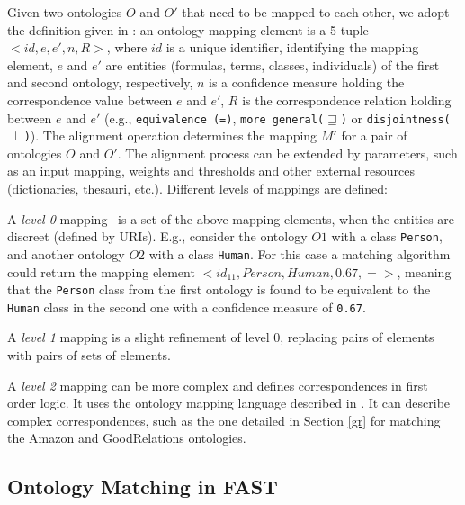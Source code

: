 Given two ontologies $O$ and $O'$ that need to be mapped to each other, we adopt the definition given in \cite{shvaiko2005schema_based}: an ontology mapping element is a 5-tuple $<id, e, e', n, R>$, where 
$id$ is a unique identifier, identifying the
mapping element, 
$e$ and $e'$ are entities (formulas, terms, classes, individuals) of the first and second ontology, respectively, 
$n$ is a confidence measure holding the correspondence value between $e$ and
$e'$, 
$R$ is the correspondence relation holding between $e$ and $e'$ (e.g., \texttt{equivalence (=)}, \texttt{more general($\sqsupseteq$)} or \texttt{disjointness($\perp$)}).
The alignment operation determines the mapping $M'$ for a pair of ontologies $O$ and $O'$. The alignment process can be extended by parameters, such as an input mapping, weights and thresholds and other external resources (dictionaries, thesauri, etc.). Different levels of mappings are defined:

A \textit{level 0} mapping~\cite{euzenat2004api} is a set of the above mapping elements, when the entities are discreet (defined by URIs). E.g., consider the ontology $O1$ with a class \texttt{Person}, and another ontology $O2$ with a class \texttt{Human}. For this case a matching algorithm  could return the mapping element $< id_{11}, Person, Human, 0.67, = >$, meaning that the \texttt{Person} class from the first ontology is found to be equivalent to the \texttt{Human} class in the second one with a confidence measure of \texttt{0.67}.

A \textit{level 1} mapping is a slight refinement of level 0, replacing pairs of elements with pairs of sets of elements.

A \textit{level 2} mapping can be more complex and defines correspondences in first order logic. It uses the ontology mapping language described in \cite{scharffe2005language}. It can describe complex correspondences, such as the one detailed in Section \ref{gr} for matching the Amazon and GoodRelations ontologies.
% 
 

\subsection{Ontology Matching in FAST}
\label{ominfast}

